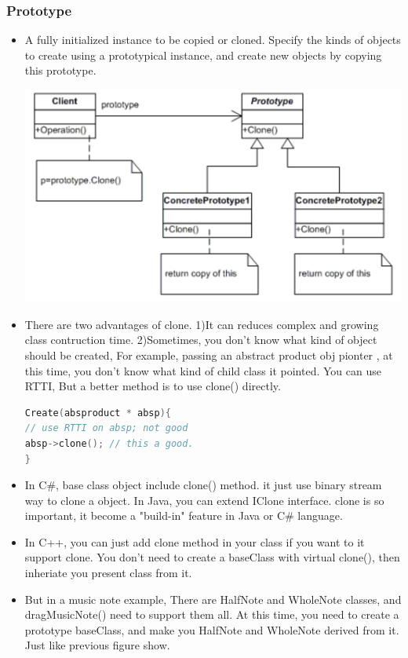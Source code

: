 \documentclass[a4paper,12pt,twoside]{book}
\begin{document}
\subsubsection{Prototype}
\begin{itemize}
\item A fully initialized instance to be copied or cloned. Specify the kinds of objects to create using a prototypical instance, and create new objects by copying this prototype.

\includegraphics[scale=0.65]{pics/prototype.png}

\item There are two advantages of clone. 1)It can reduces complex and growing class contruction time.  2)Sometimes, you don't know what kind of object should be created, For example, passing an abstract product obj pionter , at this time, you don't know what kind of child class it pointed.  You can use RTTI, But a better method is to use clone() directly. 
\begin{lstlisting}[frame=single, language=c++]
Create(absproduct * absp){
// use RTTI on absp; not good
absp->clone(); // this a good.
}
\end{lstlisting}

\item In C\#, base class object include clone() method.  it just use binary stream way to clone a object. In Java, you can extend IClone interface. clone is so important, it become a "build-in" feature in Java or C\# language. 

\item In C++, you can just add clone method in your class if you want to it support clone. You don't need to create a baseClass with virtual clone(), then inheriate you present class from it. 

\item But in a music note example, There are HalfNote and WholeNote classes, and dragMusicNote() need to support them all. At this time, you need to create a prototype baseClass, and make you HalfNote and WholeNote derived from it. Just like previous figure show. 


\end{itemize}
\end{document}
